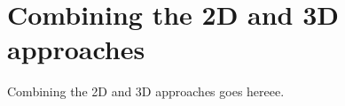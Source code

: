 \documentclass[../main.tex]{subfiles}
\begin{document}
\section{Combining the 2D and 3D approaches}


Combining the 2D and 3D approaches goes hereee.
\end{document}
